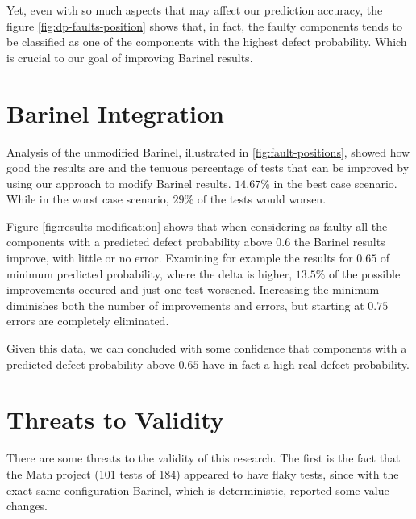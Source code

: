 
Yet, even with so much aspects that may affect our prediction accuracy, the figure \ref{fig:dp-faults-position} shows that, in fact, the faulty components tends to be classified as one of the components with the highest defect probability. Which is crucial to our goal of improving Barinel results.

\section{Barinel Integration}

Analysis of the unmodified Barinel, illustrated in \ref{fig:fault-positions}, showed how good the results are and the tenuous percentage of tests that can be improved by using our approach to modify Barinel results. $14.67\%$ in the best case scenario. While in the worst case scenario, $29\%$ of the tests would worsen.

Figure \ref{fig:results-modification} shows that when considering as faulty all the components with a predicted defect probability above $0.6$ the Barinel results improve, with little or no error. Examining for example the results for $0.65$ of minimum predicted probability, where the delta is higher, $13.5\%$ of the possible improvements occured and just one test worsened. Increasing the minimum diminishes both the number of improvements and errors, but starting at $0.75$ errors are completely eliminated.

Given this data, we can concluded with some confidence that components with a predicted defect probability above $0.65$ have in fact a high real defect probability.


\section{Threats to Validity}

There are some threats to the validity of this research. The first is the fact that the Math project (101 tests of 184) appeared to have flaky tests, since with the exact same configuration Barinel, which is deterministic, reported some value changes. 

